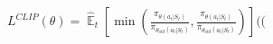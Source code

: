 \documentclass[preview]{standalone}
\begin{document}
\begin{align*}
L^{CLIP}(\theta) = \hat{\mathop{\mathbb{E}}}_t \left[ \min ( \frac{\pi_{\theta(a_t|S_t)}}{\pi_{\theta_{old}(a_t|S_t)}} , \frac{\pi_{\theta(a_t|S_t)}}{\pi_{\theta_{old}(a_t|S_t)}} ) \right] ( (
\end{align*}
\end{document}
